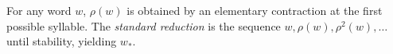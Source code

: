 For any word $w$, $\rho(w)$ is obtained by an elementary contraction at the first possible syllable. The \textit{standard reduction} is the sequence $w, \rho(w), \rho^2(w), \dots$ until stability, yielding $w_*$.
